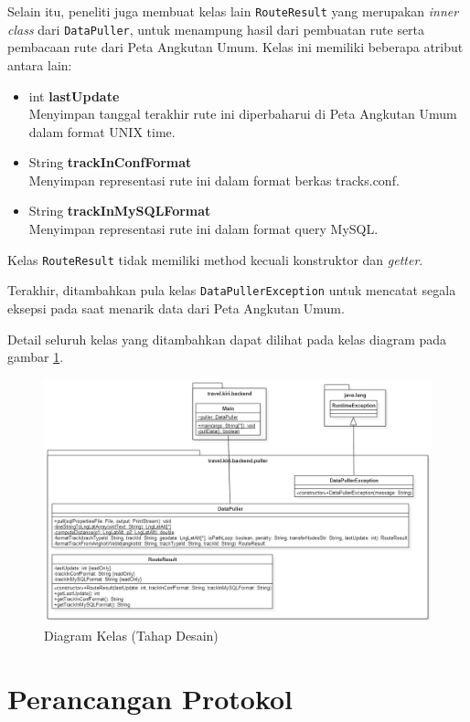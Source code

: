 Selain itu, peneliti juga membuat kelas lain \texttt{RouteResult} yang merupakan \textit{inner class} dari \texttt{DataPuller}, untuk menampung hasil dari pembuatan rute serta pembacaan rute dari Peta Angkutan Umum. Kelas ini memiliki beberapa atribut antara lain:

\begin{itemize}
	\item int \textbf{lastUpdate} \\
		Menyimpan tanggal terakhir rute ini diperbaharui di Peta Angkutan Umum dalam format UNIX time.
	\item String \textbf{trackInConfFormat} \\
		Menyimpan representasi rute ini dalam format berkas tracks.conf.
	\item String \textbf{trackInMySQLFormat} \\
		Menyimpan representasi rute ini dalam format query MySQL.
\end{itemize}

Kelas \texttt{RouteResult} tidak memiliki method kecuali konstruktor dan \textit{getter}.

Terakhir, ditambahkan pula kelas \texttt{DataPullerException} untuk mencatat segala eksepsi pada saat menarik data dari Peta Angkutan Umum.

Detail seluruh kelas yang ditambahkan dapat dilihat pada kelas diagram pada gambar \ref{fig:4_diagram_kelas}.

\begin{figure}
	\centering
	\includegraphics[scale=0.45]{Gambar/4_diagram_kelas}
	\caption{Diagram Kelas (Tahap Desain)} 
	\label{fig:4_diagram_kelas}
\end{figure}

\section{Perancangan Protokol}


